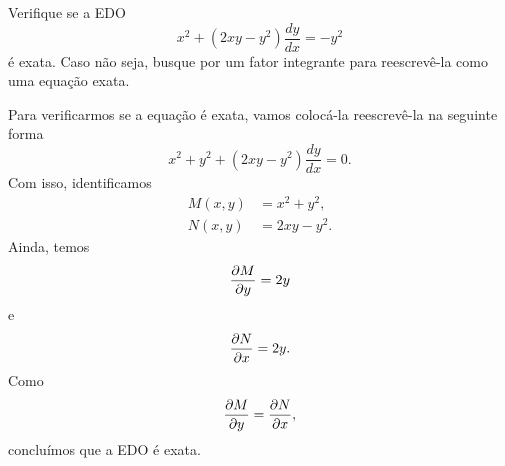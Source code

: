\begin{exeresol}
  Verifique se a EDO
  \begin{equation}
    x^2 + (2xy-y^2)\frac{dy}{dx} = -y^2
  \end{equation}
  é exata. Caso não seja, busque por um fator integrante para reescrevê-la como uma equação exata.
\end{exeresol}
\begin{resol}
  Para verificarmos se a equação é exata, vamos colocá-la reescrevê-la na seguinte forma
  \begin{equation}
    x^2 + y^2 + (2xy-y^2)\frac{dy}{dx} = 0.
  \end{equation}
  Com isso, identificamos
  \begin{align}
    M(x,y) &= x^2 + y^2,\\
    N(x,y) &= 2xy-y^2.
  \end{align}
  Ainda, temos
  \begin{equation}
    \frac{\partial M}{\partial y} = 2y
  \end{equation}
  e
  \begin{equation}
    \frac{\partial N}{\partial x} = 2y.
  \end{equation}
  Como
  \begin{equation}
    \frac{\partial M}{\partial y} = \frac{\partial N}{\partial x},
  \end{equation}
  concluímos que a EDO é exata.
\end{resol}


